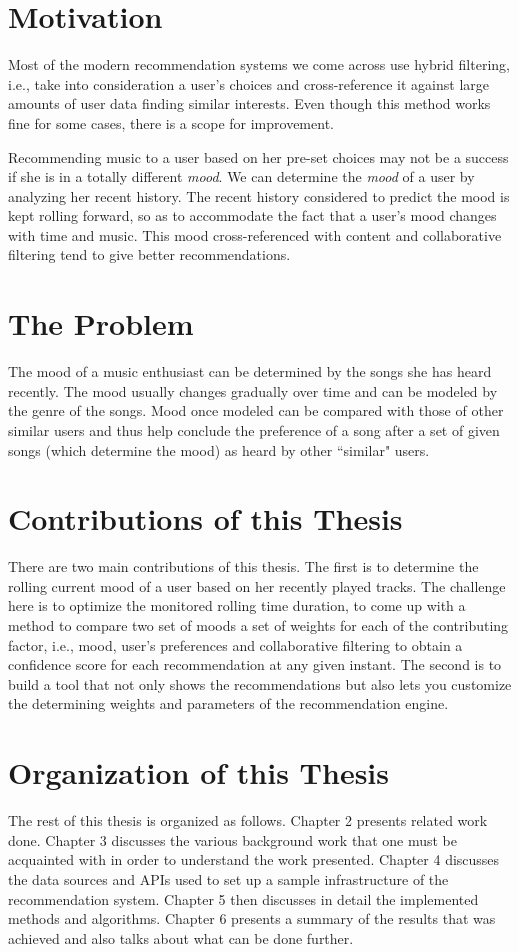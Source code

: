 	\section{Motivation}
		Most of the modern recommendation systems we come across use hybrid filtering, i.e., take into consideration a user's choices and cross-reference it against large amounts of user data finding similar interests. Even though this method works fine for some cases, there is a scope for improvement.

		Recommending music to a user based on her pre-set choices may not be a success if she is in a totally different \emph{mood}. We can determine the \emph{mood} of a user by analyzing her recent history. The recent history considered to predict the mood is kept rolling forward, so as to accommodate the fact that a user's mood changes with time and music. This mood cross-referenced with content and collaborative filtering tend to give better recommendations.

	\section{The Problem}
		The mood of a music enthusiast can be determined by the songs she has heard recently. The mood usually changes gradually over time and can be modeled by the genre of the songs. Mood once modeled can be compared with those of other similar users and thus help conclude the preference of a song after a set of given songs (which determine the mood) as heard by other ``similar" users.

	\section{Contributions of this Thesis}
		There are two main contributions of this thesis. The first is to determine the rolling current mood of a user based on her recently played tracks. The challenge here is to optimize the monitored rolling time duration, to come up with a method to compare two set of moods a set of weights for each of the contributing factor, i.e., mood, user's preferences and collaborative filtering to obtain a confidence score for each recommendation at any given instant. The second is to build a tool that not only shows the recommendations but also lets you customize the determining weights and parameters of the recommendation engine.

	\section{Organization of this Thesis}
		The rest of this thesis is organized as follows. Chapter 2 presents related work done. Chapter 3 discusses the various background work that one must be acquainted with in order to understand the work presented. Chapter 4 discusses the data sources and APIs used to set up a sample infrastructure of the recommendation system. Chapter 5 then discusses in detail the implemented methods and algorithms. Chapter 6 presents a summary of the results that was achieved and also talks about what can be done further.
